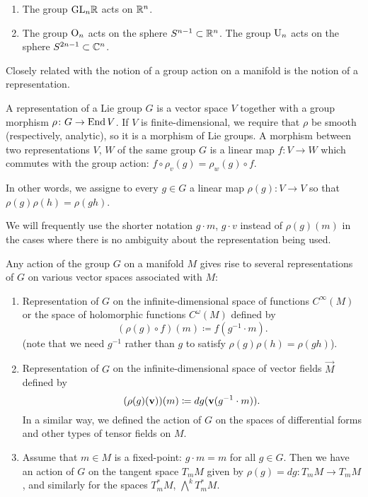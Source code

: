 \begin{example}
  \hfill
  \begin{enumerate}[label=(\arabic*)]
  \item The group $\mathrm{GL}_n\mathbb{R}$ acts on $\mathbb{R}^n$.
  \item The group $\mathrm{O}_n$ acts on the sphere $S^{n-1}\subset\mathbb{R}^n$. The
    group $\mathrm{U}_n$ acts on the sphere $S^{2n-1}\subset\mathbb{C}^n$.
  \end{enumerate}
\end{example}
Closely related with the notion of a group action on a manifold is the
notion of a representation.

\begin{definition}
A representation of a Lie group $G$ is a vector space $V$ together with a
group morphism $\rho\colon G\to\operatorname{End} V$. If $V$ is finite-dimensional, we
require that $\rho$ be smooth (respectively, analytic), so it is a morphism
of Lie groups. A morphism between two representations $V$, $W$ of the same
group $G$ is a linear map $f\colon V\to W$ which commutes with the group
action: $f\circ\rho_v(g)=\rho_w(g)\circ f$.
\end{definition}

In other words, we assigne to every $g\in G$ a linear map $\rho(g)\colon
V\to V$ so that $\rho(g)\rho(h)=\rho(gh)$.

We will frequently use the shorter notation $g\cdot m$, $g\cdot v$ instead
of $\rho(g)(m)$ in the cases where there is no ambiguity about the
representation being used.

Any action of the group $G$ on a manifold $M$ gives rise to several
representations of $G$ on various vector spaces associated with $M$:
\begin{enumerate}[label=(\arabic*)]
\item Representation of $G$ on the infinite-dimensional space of functions
  $C^\infty(M)$ or the space of holomorphic functions $C^\omega(M)$ defined
  by
  \[
    (\rho(g)\circ f)(m)\coloneq f(g^{-1}\cdot m).
  \]
  (note that we need $g^{-1}$ rather than $g$ to satisfy
  $\rho(g)\rho(h)=\rho(gh)$).
\item Representation of $G$ on the infinite-dimensional space of vector
  fields $\Vec M$ defined by
  \[
    (\rho(g)(\mathbf{v}))(m)\coloneq dg(\mathbf{v}(g^{-1}\cdot m)).
  \]
  In a similar way, we defined the action of $G$ on the spaces of
  differential forms and other types of tensor fields on $M$.
\item Assume that $m\in M$ is a fixed-point: $g\cdot m=m$ for all $g\in
  G$. Then we have an action of $G$ on the tangent space $T_mM$ given by
  $\rho(g)=dg\colon T_mM\to T_mM$, and similarly for the spaces $T_m^*M$,
  $\bigwedge^k T_m^*M$.
\end{enumerate}

